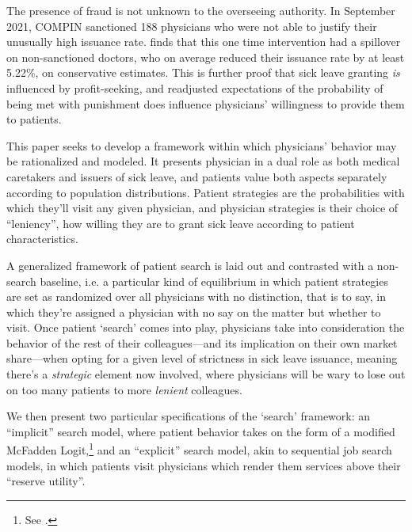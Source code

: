 \documentclass[../main.tex]{subfiles}
\begin{document}
The presence of fraud is not unknown to the overseeing authority. In September 2021, COMPIN sanctioned 188 physicians who were not able to justify their unusually high issuance rate. \cite{oteiza} finds that this one time intervention had a spillover on non-sanctioned doctors, who on average reduced their issuance rate by at least 5.22\%, on conservative estimates. This is further proof that sick leave granting \textit{is} influenced by profit-seeking, and readjusted expectations of the probability of being met with punishment does influence physicians' willingness to provide them to patients.

This paper seeks to develop a framework within which physicians' behavior may be rationalized and modeled. It presents physician in a dual role as both medical caretakers and issuers of sick leave, and patients value both aspects separately according to population distributions. Patient strategies are the probabilities with which they'll visit any given physician, and physician strategies is their choice of ``leniency'', how willing they are to grant sick leave according to patient characteristics.

A generalized framework of patient search is laid out and contrasted with a non-search baseline, i.e. a particular kind of equilibrium in which patient strategies are set as randomized over all physicians with no distinction, that is to say, in which they're assigned a physician with no say on the matter but whether to visit. Once patient `search' comes into play, physicians take into consideration the behavior of the rest of their colleagues—and its implication on their own market share—when opting for a given level of strictness in sick leave issuance, meaning there's a \textit{strategic} element now involved, where physicians will be wary to lose out on too many patients to more \textit{lenient} colleagues.

We then present two particular specifications of the `search' framework: an ``implicit'' search model, where patient behavior takes on the form of a modified McFadden Logit,\footnote{See \cite{mcfadden}.} and an ``explicit'' search model, akin to sequential job search models, in which patients visit physicians which render them services above their ``reserve utility''.
\end{document}
